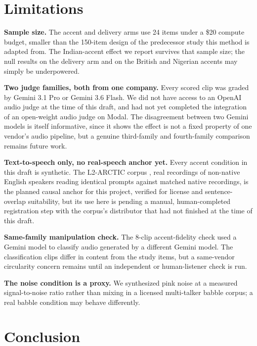 \documentclass[10pt,twocolumn]{article}
\begin{document}
\section{Limitations}
\label{sec:limitations}

\textbf{Sample size.} The accent and delivery arms use 24 items under a
\$20 compute budget, smaller than the 150-item design of the predecessor
study this method is adapted from. The Indian-accent effect we report
survives that sample size; the null results on the delivery arm and on the
British and Nigerian accents may simply be underpowered.

\textbf{Two judge families, both from one company.} Every scored clip was
graded by Gemini 3.1 Pro or Gemini 3.6 Flash. We did not have access to an
OpenAI audio judge at the time of this draft, and had not yet completed the
integration of an open-weight audio judge on Modal. The disagreement between
two Gemini models is itself informative, since it shows the effect is not a
fixed property of one vendor's audio pipeline, but a genuine third-family
and fourth-family comparison remains future work.

\textbf{Text-to-speech only, no real-speech anchor yet.} Every accent
condition in this draft is synthetic. The L2-ARCTIC corpus
\citep{zhao2018l2arctic}, real recordings
of non-native English speakers reading identical prompts against matched
native recordings, is the planned causal anchor for this project, verified
for license and sentence-overlap suitability, but its use here is pending a
manual, human-completed registration step with the corpus's distributor
that had not finished at the time of this draft.

\textbf{Same-family manipulation check.} The 8-clip accent-fidelity check
used a Gemini model to classify audio generated by a different Gemini
model. The classification clips differ in content from the study items, but
a same-vendor circularity concern remains until an independent or
human-listener check is run.

\textbf{The noise condition is a proxy.} We synthesized pink noise at a
measured signal-to-noise ratio rather than mixing in a licensed
multi-talker babble corpus; a real babble condition may behave differently.

\section{Conclusion}
\end{document}
